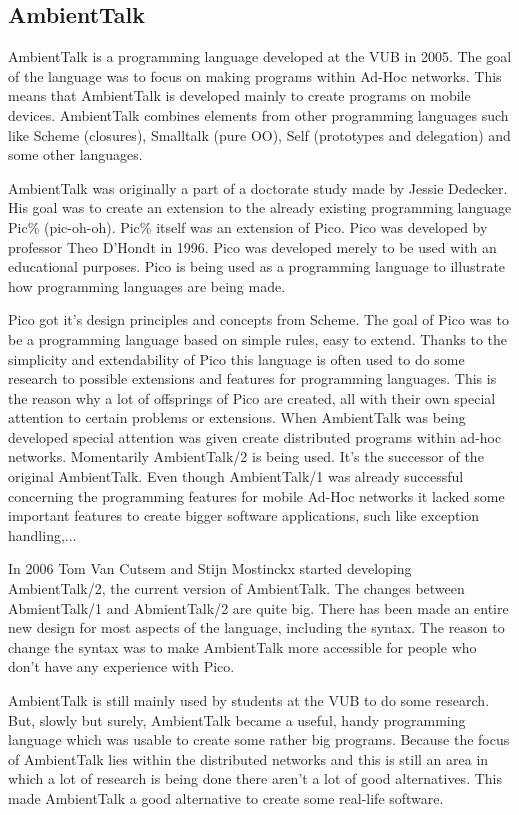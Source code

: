 \documentclass[a4paper,12pt]{report}
\begin{document}
\subsection{AmbientTalk}
AmbientTalk is a programming language developed at the VUB in 2005. The goal of the language was to focus on making programs within Ad-Hoc networks. This means that AmbientTalk is developed mainly
to create programs on mobile devices. AmbientTalk combines elements from other programming languages such like Scheme (closures), Smalltalk (pure OO), Self (prototypes and delegation) and some
other languages.

AmbientTalk was originally a part of a doctorate study made by Jessie Dedecker. His goal was to create an extension to the already existing programming language Pic\% (pic-oh-oh). Pic\% itself
was an extension of Pico. Pico was developed by professor Theo D'Hondt in 1996. Pico was developed merely to be used with an educational purposes. Pico is being used as a programming language to
illustrate how programming languages are being made.

Pico got it's design principles and concepts from Scheme. The goal of Pico was to be a programming language based on simple rules, easy to extend. Thanks to the simplicity and extendability of Pico
this language is often used to do some research to possible extensions and features for programming languages. This is the reason why a lot of offsprings of Pico are created, all with their own
special attention to certain problems or extensions. When AmbientTalk was being developed special attention was given create distributed programs within ad-hoc networks.
Momentarily AmbientTalk/2 is being used. It's the successor of the original AmbientTalk. Even though AmbientTalk/1 was already successful concerning the programming features for mobile Ad-Hoc
networks it lacked some important features to create bigger software applications, such like exception handling,...

In 2006 Tom Van Cutsem and Stijn Mostinckx started developing AmbientTalk/2, the current version of AmbientTalk. The changes between AbmientTalk/1 and AbmientTalk/2 are quite big. There has been
made an entire new design for most aspects of the language, including the syntax. The reason to change the syntax was to make AmbientTalk more accessible for people who don't have any experience
with Pico. 

AmbientTalk is still mainly used by students at the VUB to do some research. But, slowly but surely, AmbientTalk became a useful, handy programming language which was usable to create some
rather big programs. Because the focus of AmbientTalk lies within the distributed networks and this is still an area in which a lot of research is being done there aren't a lot of good alternatives.
This made AmbientTalk a good alternative to create some real-life software.
\end{document}
